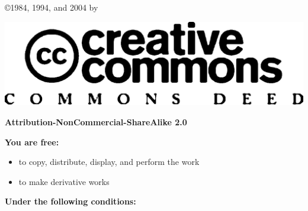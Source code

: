 
\pagebreak

\vspace*{100pt}

\begin{center}\copyright 1984, 1994, and 2004 by 

\bigskip

\includegraphics{img-cc}

\bigskip

\textbf{Attribution-NonCommercial-ShareAlike 2.0}
\end{center}
\textbf{You are free:}

\begin{itemize}
\item to copy, distribute, display, and perform the work
 
\item to make derivative works
\end{itemize}
\textbf{Under the following conditions:}

